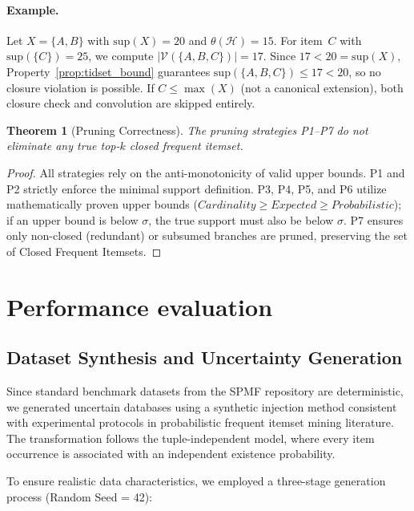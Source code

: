 \documentclass[10pt,letterpaper]{article}
\newtheorem{theorem}{Theorem}
\newcounter{definition}
\begin{document}
\paragraph{Example.} Let $X = \{A, B\}$ with $\mathrm{sup}(X) = 20$ and
$\theta(\mathcal{H}) = 15$. For item~$C$ with $\mathrm{sup}(\{C\}) = 25$,
we compute $|\mathcal{V}(\{A,B,C\})| = 17$. Since $17 < 20 = \mathrm{sup}(X)$,
Property~\ref{prop:tidset_bound} guarantees
$\mathrm{sup}(\{A,B,C\}) \le 17 < 20$, so no closure violation is possible.
If $C \le \max(X)$ (not a canonical extension), both closure check and
convolution are skipped entirely.

\begin{theorem}[Pruning Correctness]
\label{thm:pruning}
The pruning strategies P1–P7 do not eliminate any true top-$k$ closed frequent itemset.
\end{theorem}

\begin{proof}
All strategies rely on the anti-monotonicity of valid upper bounds. P1 and P2 strictly enforce the minimal support definition. P3, P4, P5, and P6 utilize mathematically proven upper bounds ($Cardinality \ge Expected \ge Probabilistic$); if an upper bound is below $\sigma$, the true support must also be below $\sigma$. P7 ensures only non-closed (redundant) or subsumed branches are pruned, preserving the set of Closed Frequent Itemsets.
\end{proof}




\section*{Performance evaluation}

\subsection*{Dataset Synthesis and Uncertainty Generation}

Since standard benchmark datasets from the SPMF repository are deterministic, we generated uncertain databases using a synthetic injection method consistent with experimental protocols in probabilistic frequent itemset mining literature. The transformation follows the tuple-independent model, where every item occurrence is associated with an independent existence probability.

To ensure realistic data characteristics, we employed a three-stage generation process (Random Seed = 42):
\end{document}

